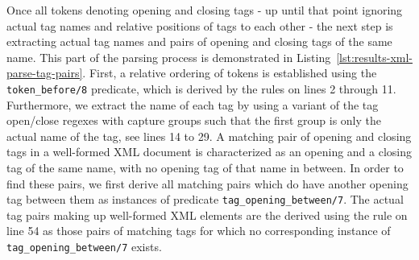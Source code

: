 Once all tokens denoting opening and closing tags - up until that point ignoring actual tag names and relative positions of tags to each other - the next step is extracting actual tag names and pairs of opening and closing tags of the same name. This part of the parsing process is demonstrated in Listing~\ref{lst:results-xml-parse-tag-pairs}. First, a relative ordering of tokens is established using the \texttt{token\_before/8} predicate, which is derived by the rules on lines 2 through 11. Furthermore, we extract the name of each tag by using a variant of the tag open/close regexes with capture groups such that the first group is only the actual name of the tag, see lines 14 to 29. A matching pair of opening and closing tags in a well-formed XML document is characterized as an opening and a closing tag of the same name, with no opening tag of that name in between. In order to find these pairs, we first derive all matching pairs which do have another opening tag between them as instances of predicate \texttt{tag\_opening\_between/7}. The actual tag pairs making up well-formed XML elements are the derived using the rule on line 54 as those pairs of matching tags for which no corresponding instance of \texttt{tag\_opening\_between/7} exists.

